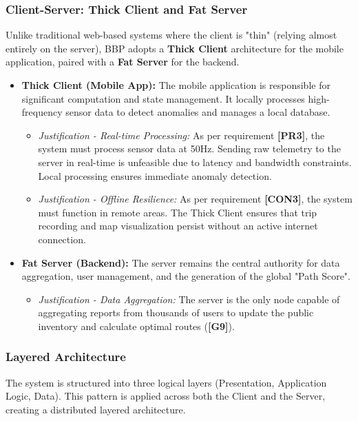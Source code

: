 \subsubsection{Client-Server: Thick Client and Fat Server}
Unlike traditional web-based systems where the client is "thin" (relying almost entirely on the server), BBP adopts a \textbf{Thick Client} architecture for the mobile application, paired with a \textbf{Fat Server} for the backend.

\begin{itemize}
    \item \textbf{Thick Client (Mobile App):} The mobile application is responsible for significant computation and state management. It locally processes high-frequency sensor data to detect anomalies and manages a local database.
    \begin{itemize}
        \item \textit{Justification - Real-time Processing:} As per requirement \textbf{[PR3]}, the system must process sensor data at 50Hz. Sending raw telemetry to the server in real-time is unfeasible due to latency and bandwidth constraints. Local processing ensures immediate anomaly detection.
        \item \textit{Justification - Offline Resilience:} As per requirement \textbf{[CON3]}, the system must function in remote areas. The Thick Client ensures that trip recording and map visualization persist without an active internet connection.
    \end{itemize}
    
    \item \textbf{Fat Server (Backend):} The server remains the central authority for data aggregation, user management, and the generation of the global "Path Score".
    \begin{itemize}
        \item \textit{Justification - Data Aggregation:} The server is the only node capable of aggregating reports from thousands of users to update the public inventory and calculate optimal routes (\textbf{[G9]}).
    \end{itemize}
\end{itemize}

\subsubsection{Layered Architecture}
The system is structured into three logical layers (Presentation, Application Logic, Data). This pattern is applied across both the Client and the Server, creating a distributed layered architecture.

